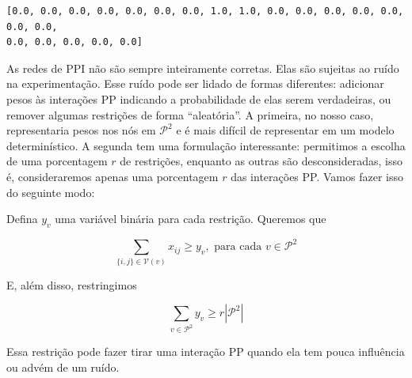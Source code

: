 \documentclass[11pt]{article}
\begin{document}
\begin{Verbatim}[commandchars=\\\{\}]
[0.0, 0.0, 0.0, 0.0, 0.0, 0.0, 0.0, 1.0, 1.0, 0.0, 0.0, 0.0, 0.0, 0.0, 0.0, 0.0,
0.0, 0.0, 0.0, 0.0, 0.0]
\end{Verbatim}

As redes de PPI não são sempre inteiramente corretas. Elas são sujeitas
ao ruído na experimentação. Esse ruído pode ser lidado de formas
diferentes: adicionar pesos às interações PP indicando a probabilidade
de elas serem verdadeiras, ou remover algumas restrições de forma
``aleatória''. A primeira, no nosso caso, representaria pesos nos nós em
\(\mathcal{P}^2\) e é mais difícil de representar em um modelo
determinístico. A segunda tem uma formulação interessante: permitimos a
escolha de uma porcentagem \(r\) de restrições, enquanto as outras são
desconsideradas, isso é, consideraremos apenas uma porcentagem \(r\) das
interações PP. Vamos fazer isso do seguinte modo:

Defina \(y_v\) uma variável binária para cada restrição. Queremos que

\[\sum_{\{i,j\} \in \mathcal{V}(v)} x_{ij} \ge y_v, \text{ para cada } v \in \mathcal{P}^2\]

E, além disso, restringimos

\[
\sum_{v \in \mathcal{P}^2} y_v \ge r |\mathcal{P}^2| 
\]

Essa restrição pode fazer tirar uma interação PP quando ela tem pouca
influência ou advém de um ruído.
\end{document}

